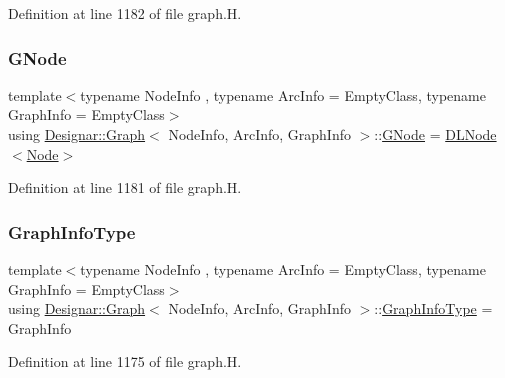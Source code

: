 Definition at line 1182 of file graph.\+H.

\mbox{\label{class_designar_1_1_graph_a7e61951db0bb9bfa8a2e317440d4e17f}} 
\subsubsection{\texorpdfstring{G\+Node}{GNode}}
{\footnotesize\ttfamily template$<$typename Node\+Info , typename Arc\+Info  = Empty\+Class, typename Graph\+Info  = Empty\+Class$>$ \\
using \hyperlink{class_designar_1_1_graph}{Designar\+::\+Graph}$<$ Node\+Info, Arc\+Info, Graph\+Info $>$\+::\hyperlink{class_designar_1_1_graph_a7e61951db0bb9bfa8a2e317440d4e17f}{G\+Node} =  \hyperlink{class_designar_1_1_d_l_node}{D\+L\+Node}$<$\hyperlink{class_designar_1_1_graph_a5dfc7dba9d092ac489c72e40390c37d0}{Node}$>$\hspace{0.3cm}{\ttfamily [protected]}}



Definition at line 1181 of file graph.\+H.

\mbox{\label{class_designar_1_1_graph_a5b6ad505f3b0f5a5cd288a13bebf2d27}} 
\subsubsection{\texorpdfstring{Graph\+Info\+Type}{GraphInfoType}}
{\footnotesize\ttfamily template$<$typename Node\+Info , typename Arc\+Info  = Empty\+Class, typename Graph\+Info  = Empty\+Class$>$ \\
using \hyperlink{class_designar_1_1_graph}{Designar\+::\+Graph}$<$ Node\+Info, Arc\+Info, Graph\+Info $>$\+::\hyperlink{class_designar_1_1_graph_a5b6ad505f3b0f5a5cd288a13bebf2d27}{Graph\+Info\+Type} =  Graph\+Info}



Definition at line 1175 of file graph.\+H.

\mbox{\label{class_designar_1_1_graph_a5dfc7dba9d092ac489c72e40390c37d0}} 
